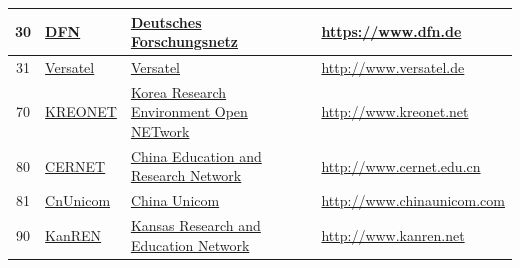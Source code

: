 \begin{small}
\begin{center}
\begin{longtable}{|c|c|c|c|}
 30 & \multicolumn{1}{|l|}{\index{DFN|see{Deutsches Forschungsnetz}}\index{Provider!Deutsches Forschungsnetz}\href{https://www.dfn.de}{DFN}} & \multicolumn{1}{|l|}{\index{Deutsches Forschungsnetz}\href{https://www.dfn.de}{Deutsches Forschungsnetz}} & \multicolumn{1}{|l|}{\tiny{\url{https://www.dfn.de}}} \\ \hline
 31 & \multicolumn{1}{|l|}{\index{Versatel}\index{Provider!Versatel}\href{http://www.versatel.de}{Versatel}} & \multicolumn{1}{|l|}{\index{Versatel}\href{http://www.versatel.de}{Versatel}} & \multicolumn{1}{|l|}{\tiny{\url{http://www.versatel.de}}} \\ \hline
 70 & \multicolumn{1}{|l|}{\index{KREONET|see{Korea Research Environment Open NETwork}}\index{Provider!Korea Research Environment Open NETwork}\href{http://www.kreonet.net}{KREONET}} & \multicolumn{1}{|l|}{\index{Korea Research Environment Open NETwork}\href{http://www.kreonet.net}{Korea Research Environment Open NETwork}} & \multicolumn{1}{|l|}{\tiny{\url{http://www.kreonet.net}}} \\ \hline
 80 & \multicolumn{1}{|l|}{\index{CERNET|see{China Education and Research Network}}\index{Provider!China Education and Research Network}\href{http://www.cernet.edu.cn}{CERNET}} & \multicolumn{1}{|l|}{\index{China Education and Research Network}\href{http://www.cernet.edu.cn}{China Education and Research Network}} & \multicolumn{1}{|l|}{\tiny{\url{http://www.cernet.edu.cn}}} \\ \hline
 81 & \multicolumn{1}{|l|}{\index{CnUnicom|see{China Unicom}}\index{Provider!China Unicom}\href{http://www.chinaunicom.com}{CnUnicom}} & \multicolumn{1}{|l|}{\index{China Unicom}\href{http://www.chinaunicom.com}{China Unicom}} & \multicolumn{1}{|l|}{\tiny{\url{http://www.chinaunicom.com}}} \\ \hline
 90 & \multicolumn{1}{|l|}{\index{KanREN|see{Kansas Research and Education Network}}\index{Provider!Kansas Research and Education Network}\href{http://www.kanren.net}{KanREN}} & \multicolumn{1}{|l|}{\index{Kansas Research and Education Network}\href{http://www.kanren.net}{Kansas Research and Education Network}} & \multicolumn{1}{|l|}{\tiny{\url{http://www.kanren.net}}} \\ \hline
\end{longtable}
\end{center}
\end{small}




